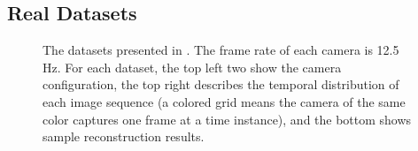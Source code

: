 \subsection{Real Datasets}
\begin{figure}
\centering
{}

\caption[Example output of two real datasets.]{The datasets presented in \cite{ballan2010unstructured}. The frame rate of each camera is 12.5 Hz. For each dataset, the top left two show the camera configuration, the top right describes the temporal distribution of each image sequence (a colored grid means the camera of the same color captures one frame at a time instance), and the bottom shows sample reconstruction results. }
\label{fig:onlinedata}
\end{figure}

